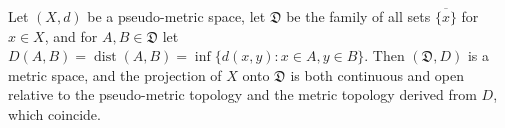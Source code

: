 Let $(X,d)$ be a pseudo-metric space, let $\mathfrak{D}$ be the family of all sets $\overline{\{x\}}$ for $x \in X$, and for $A, B \in \mathfrak{D}$ let $D(A,B) = \operatorname{dist}(A,B) = \inf \{d(x,y) : x \in A, y \in B\}$. Then $(\mathfrak{D}, D)$ is a metric space, and the projection of $X$ onto $\mathfrak{D}$ is both continuous and open relative to the pseudo-metric topology and the metric topology derived from $D$, which coincide.
